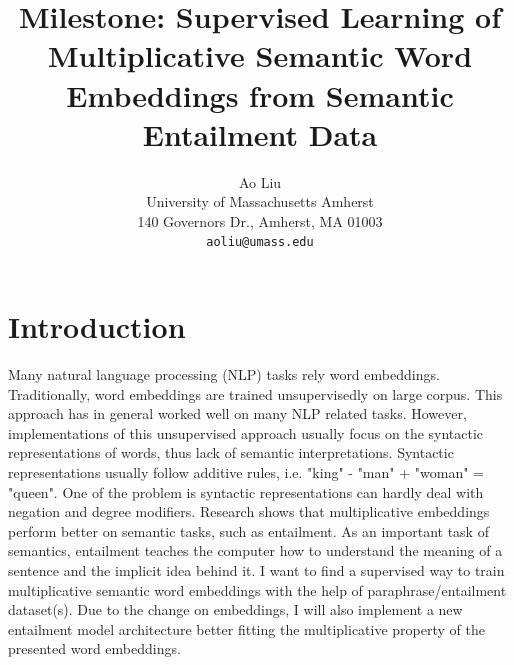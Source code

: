 \documentclass[10pt,twocolumn,letterpaper]{article}
\begin{document}
\title{Milestone: Supervised Learning of Multiplicative Semantic Word Embeddings from Semantic Entailment Data}

\author{Ao Liu\\
University of Massachusetts Amherst\\
140 Governors Dr., Amherst, MA 01003 \\
{\tt\small aoliu@umass.edu}
}

\maketitle

%

\section{Introduction}
Many natural language processing (NLP) tasks rely word embeddings. Traditionally, word embeddings are trained unsupervisedly on large corpus. This approach has in general worked well on many NLP related tasks. However, implementations of this unsupervised approach usually focus on the syntactic representations of words, thus lack of semantic interpretations. Syntactic representations usually follow additive rules, i.e. "king" - "man" + "woman" = "queen". One of the problem is syntactic representations can hardly deal with negation and degree modifiers. Research shows that multiplicative embeddings perform better on semantic tasks, such as entailment. As an important task of semantics, entailment teaches the computer how to understand the meaning of a sentence and the implicit idea behind it. I want to find a supervised way to train multiplicative semantic word embeddings with the help of paraphrase/entailment dataset(s). Due to the change on embeddings, I will also implement a new entailment model architecture better fitting the multiplicative property of the presented word embeddings.
\end{document}
